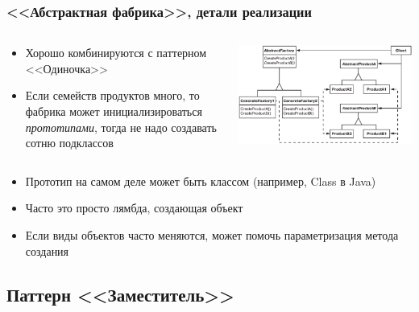\documentclass{../../slides-style}
\begin{document}
    \begin{frame}
        \frametitle{<<Абстрактная фабрика>>, детали реализации}
        \begin{columns}
            \begin{column}{0.5\textwidth}
                \begin{itemize}
                    \item Хорошо комбинируются с паттерном <<Одиночка>>
                    \item Если семейств продуктов много, то фабрика может инициализироваться \textit{прототипами}, тогда не надо создавать сотню подклассов
                \end{itemize}
            \end{column}
            \begin{column}{0.5\textwidth}
                \begin{center}
                    \includegraphics[width=\textwidth]{abstractFactory.png}
                \end{center}
            \end{column}
        \end{columns}
        \begin{itemize}
            \item Прототип на самом деле может быть классом (например, Class в Java)
            \item Часто это просто лямбда, создающая объект
            \item Если виды объектов часто меняются, может помочь параметризация метода создания
        \end{itemize}
    \end{frame}

    \subsection{Паттерн <<Заместитель>>}
\end{document}
